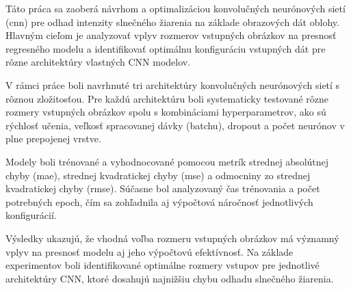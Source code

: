 Táto práca sa zaoberá návrhom a optimalizáciou konvolučných neurónových sietí (\acrshort{cnn}) pre odhad intenzity slnečného žiarenia 
na základe obrazových dát oblohy. Hlavným cieľom je analyzovať vplyv rozmerov vstupných obrázkov na presnosť regresného 
modelu a identifikovať optimálnu konfiguráciu vstupných dát pre rôzne architektúry vlastných CNN modelov.

V rámci práce boli navrhnuté tri architektúry konvolučných neurónových sietí s rôznou zložitosťou.
 Pre každú architektúru boli systematicky testované rôzne rozmery vstupných obrázkov spolu s kombináciami hyperparametrov, 
 ako sú rýchlosť učenia, veľkosť spracovanej dávky (batchu), dropout a počet neurónov v plne prepojenej vrstve.

Modely boli trénované a vyhodnocované pomocou metrík strednej absolútnej chyby (\acrshort{mae}), strednej 
kvadratickej chyby (\acrshort{mse}) a 
odmocniny zo strednej kvadratickej chyby (\acrshort{rmse}). Súčasne bol analyzovaný čas trénovania a počet potrebných epoch, čím sa 
zohľadnila aj výpočtová náročnosť jednotlivých konfigurácií.

Výsledky ukazujú, že vhodná voľba rozmeru vstupných obrázkov má významný vplyv na presnosť modelu aj jeho výpočtovú 
efektívnosť. Na základe experimentov boli identifikované optimálne rozmery vstupov pre jednotlivé architektúry CNN, 
ktoré dosahujú najnižšiu chybu odhadu slnečného žiarenia.